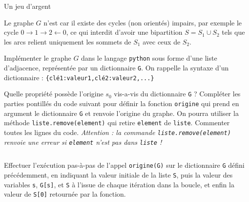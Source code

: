 \begin{exo}[PC][1][devoir]{Un jeu d'argent}
\begin{quest}
{      
      Le graphe $G$ n’est  car il existe des cycles (non orientés) impairs, par exemple le cycle $ 0 \rightarrow 1 \rightarrow 2 \leftarrow 0$, ce qui interdit d’avoir une bipartition $S  = S_1 \cup S_2$ tels que les arcs relient uniquement les sommets de $S_1$ avec ceux de $S_2$. 
    }
    \item	Implémenter le graphe $G$ dans le langage \texttt{python} sous forme d'une liste d'adjacence, représentée par un dictionnaire \texttt{G}. On rappelle la syntaxe d'un dictionnaire : \texttt{\{clé1:valeur1,clé2:valeur2,...\}}
    \item Quelle propriété possède l’origine $s_0$ vis-a-vis du dictionnaire \texttt{G} ? Compléter les parties pontillés du code suivant pour définir la fonction \texttt{origine} qui prend en argument le dictionnaire \texttt{G} et renvoie l’origine du graphe. On pourra utiliser la méthode \texttt{liste.remove(element)} qui retire \texttt{element} de \texttt{liste}. Commenter toutes les lignes du code. \emph{Attention : la commande \texttt{liste.remove(element)} renvoie une erreur si \texttt{element} n'est pas dans \texttt{liste} !}
    \inputminted[linenos=true,frame=single]{python}{\pathtoexos/Info/Scripts/origine_G.py}
    \item Effectuer l'exécution pas-à-pas de l'appel \texttt{origine(G)} sur le dictionnaire \texttt{G} défini précédemment, en indiquant la valeur initiale de la liste \texttt{S}, puis la valeur des variables \texttt{s}, \texttt{G[s]}, et \texttt{S} à l'issue de chaque itération dans la boucle, et enfin la valeur de \texttt{S[0]} retournée par la fonction.
\end{quest}
\end{exo}
